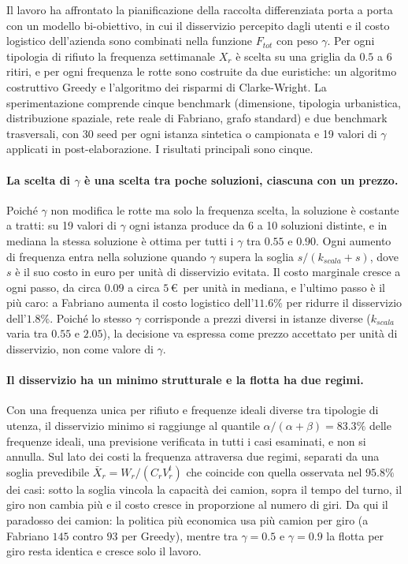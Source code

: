 Il lavoro ha affrontato la pianificazione della raccolta differenziata porta a porta con un modello bi-obiettivo, in cui il disservizio percepito dagli utenti e il costo logistico dell'azienda sono combinati nella funzione $F_{tot}$ con peso $\gamma$. Per ogni tipologia di rifiuto la frequenza settimanale $X_r$ è scelta su una griglia da $0.5$ a $6$ ritiri, e per ogni frequenza le rotte sono costruite da due euristiche: un algoritmo costruttivo Greedy e l'algoritmo dei risparmi di Clarke-Wright. La sperimentazione comprende cinque benchmark (dimensione, tipologia urbanistica, distribuzione spaziale, rete reale di Fabriano, grafo standard) e due benchmark trasversali, con 30 seed per ogni istanza sintetica o campionata e 19 valori di $\gamma$ applicati in post-elaborazione. I risultati principali sono cinque.

\paragraph{La scelta di $\gamma$ è una scelta tra poche soluzioni, ciascuna con un prezzo.}
Poiché $\gamma$ non modifica le rotte ma solo la frequenza scelta, la soluzione è costante a tratti: su 19 valori di $\gamma$ ogni istanza produce da 6 a 10 soluzioni distinte, e in mediana la stessa soluzione è ottima per tutti i $\gamma$ tra $0.55$ e $0.90$. Ogni aumento di frequenza entra nella soluzione quando $\gamma$ supera la soglia $s/(k_{scala}+s)$, dove $s$ è il suo costo in euro per unità di disservizio evitata. Il costo marginale cresce a ogni passo, da circa $0.09$ a circa $5$\,\euro\ per unità in mediana, e l'ultimo passo è il più caro: a Fabriano aumenta il costo logistico dell'$11.6\%$ per ridurre il disservizio dell'$1.8\%$. Poiché lo stesso $\gamma$ corrisponde a prezzi diversi in istanze diverse ($k_{scala}$ varia tra $0.55$ e $2.05$), la decisione va espressa come prezzo accettato per unità di disservizio, non come valore di $\gamma$.

\paragraph{Il disservizio ha un minimo strutturale e la flotta ha due regimi.}
Con una frequenza unica per rifiuto e frequenze ideali diverse tra tipologie di utenza, il disservizio minimo si raggiunge al quantile $\alpha/(\alpha+\beta)=83.3\%$ delle frequenze ideali, una previsione verificata in tutti i casi esaminati, e non si annulla. Sul lato dei costi la frequenza attraversa due regimi, separati da una soglia prevedibile $\bar X_r=W_r/(C_rV^{t}_r)$ che coincide con quella osservata nel $95.8\%$ dei casi: sotto la soglia vincola la capacità dei camion, sopra il tempo del turno, il giro non cambia più e il costo cresce in proporzione al numero di giri. Da qui il paradosso dei camion: la politica più economica usa più camion per giro (a Fabriano $145$ contro $93$ per Greedy), mentre tra $\gamma=0.5$ e $\gamma=0.9$ la flotta per giro resta identica e cresce solo il lavoro.

